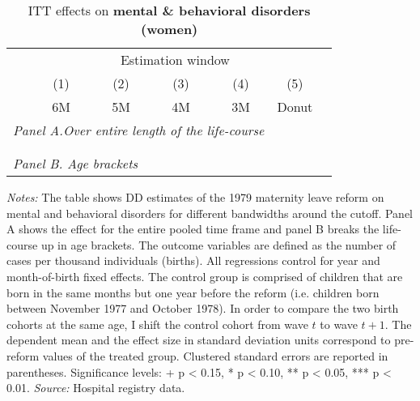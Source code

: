 \vspace*{\fill}
 \begin{table}[H] \centering 
 	\begin{threeparttable} \centering \caption{ITT effects on \textbf{mental \& behavioral disorders (women)}}\label{tab: DD_d5_female} {\def\sym#1{\ifmmode^{#1}\else\(^{#1}\)\fi} 
 			\begin{tabular}{l*{6}{c}}
 				\toprule 
 				& \multicolumn{5}{c}{Estimation window} \\ 
 				\cmidrule(lr){2-6}
 				&\multicolumn{1}{c}{(1)}&\multicolumn{1}{c}{(2)}&\multicolumn{1}{c}{(3)}&\multicolumn{1}{c}{(4)}&\multicolumn{1}{c}{(5)}\\
 				&\multicolumn{1}{c}{6M}&\multicolumn{1}{c}{5M}&\multicolumn{1}{c}{4M}&\multicolumn{1}{c}{3M}&\multicolumn{1}{c}{Donut}\\
 				\midrule
 				\multicolumn{5}{l}{\emph{Panel A.Over entire length of the life-course}} \\
 				 \\ \\
 				\multicolumn{5}{l}{\emph{Panel B. Age brackets}} \\
 				    
 				\bottomrule 
 		\end{tabular}}
 		\begin{tablenotes} 
 			\item \scriptsize \emph{Notes:} The table shows DD estimates of the 1979 maternity leave reform on mental and behavioral disorders for different bandwidths around the cutoff. Panel A shows the effect for the entire pooled time frame and panel B breaks the life-course up in age brackets. The outcome variables are defined as the number of cases per thousand individuals (births). All regressions control for year and month-of-birth fixed effects. The control group is comprised of children that are born in the same months but one year before the reform (i.e. children born between November 1977 and October 1978). In order to compare the two birth cohorts at the same age, I shift the control cohort from wave $t$ to wave $t+1$. The dependent mean and the effect size in standard deviation units correspond to pre-reform values of the treated group. Clustered standard errors are reported in parentheses. \newline Significance levels: + p < 0.15, * p < 0.10, ** p < 0.05, *** p < 0.01. \newline 	\emph{Source:} Hospital registry data.
 		\end{tablenotes} 
 	\end{threeparttable} 
 \end{table}
\vspace*{\fill}\clearpage 